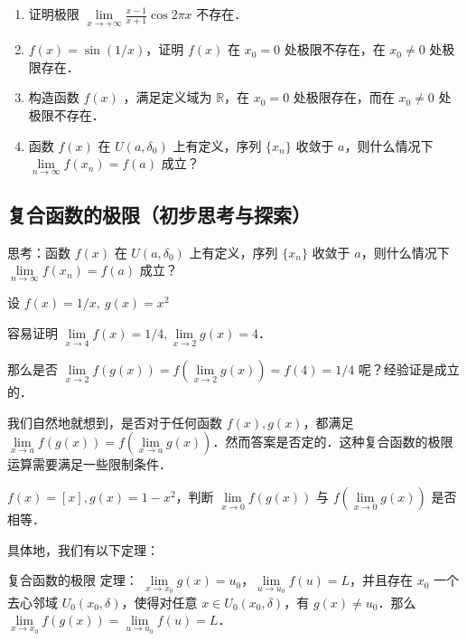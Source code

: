 \begin{exercise}{}
\begin{enumerate}
\item 证明极限 $\lim\limits_{x\rightarrow +\infty} \frac{x-1}{x+1}\cos 2\pi x$ 不存在．

\item $f(x)=\sin(1/x)$，证明 $f(x)$ 在 $x_0=0$ 处极限不存在，在 $x_0\neq 0$ 处极限存在．

\item 构造函数 $f(x)$ ，满足定义域为 $\mathbb{R}$，在 $x_0=0$ 处极限存在，而在  $x_0\neq 0$ 处极限不存在．

\item 函数 $f(x)$ 在 $U(a,\delta_0)$ 上有定义，序列 $\{x_n\}$ 收敛于 $a$，则什么情况下 $\lim\limits_{n\rightarrow \infty}f(x_n)=f(a)$ 成立？
\end{enumerate}
\end{exercise}


\subsection{复合函数的极限（初步思考与探索）}
\begin{exercise}{}
思考：函数 $f(x)$ 在 $U(a,\delta_0)$ 上有定义，序列 $\{x_n\}$ 收敛于 $a$，则什么情况下 $\lim\limits_{n\rightarrow \infty}f(x_n)=f(a)$ 成立？
\end{exercise}
设 $f(x)=1/x,\ g(x)=x^2$

  容易证明 $\lim\limits_{x\rightarrow 4}f(x)=1/4,\lim\limits_{x\rightarrow 2}g(x)=4$．

  那么是否 $\lim\limits_{x\rightarrow 2}f(g(x))=f(\lim\limits_{x\rightarrow 2}g(x))=f(4)=1/4$ 呢？经验证是成立的．

  我们自然地就想到，是否对于任何函数 $f(x),g(x)$，都满足 $\lim\limits_{x\rightarrow a}f(g(x))=f(\lim\limits_{x\rightarrow a}g(x))$．然而答案是否定的．这种复合函数的极限运算需要满足一些限制条件．
\begin{exercise}{}
$f(x)=[x],g(x)=1-x^2$，判断 $\lim\limits_{x\rightarrow 0}f(g(x)) $ 与 $f(\lim\limits_{x\rightarrow 0}g(x))$ 是否相等．
\end{exercise}

具体地，我们有以下定理：
\begin{theorem}{复合函数的极限}\label{limff_the1}
定理： $\lim\limits_{x\rightarrow x_0}g(x)=u_0$，$\lim\limits_{u\rightarrow u_0}f(u)=L$，并且存在 $x_0$ 一个去心邻域 $U_0(x_0,\delta)$，使得对任意 $x\in U_0(x_0,\delta)$，有 $g(x)\neq u_0$．那么 $\lim\limits_{x\rightarrow x_0}f(g(x))=\lim\limits_{u\rightarrow u_0}f(u)=L$．
\end{theorem}

